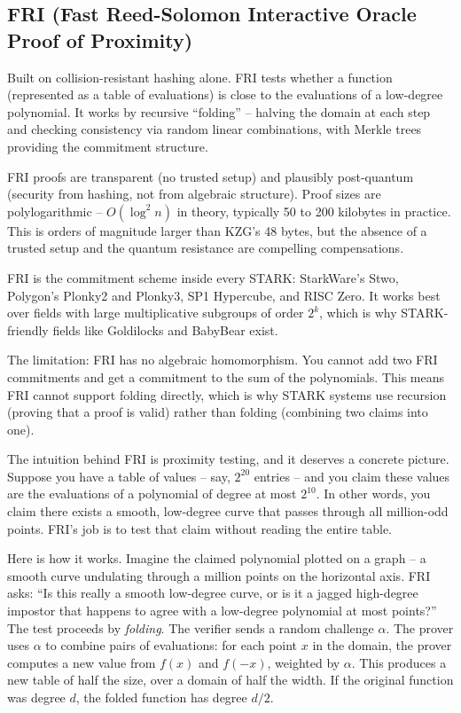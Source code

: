 \documentclass[
  11pt,
  openany]{report}
\begin{document}
\subsection{FRI (Fast Reed-Solomon Interactive Oracle Proof of
Proximity)}\label{fri-fast-reed-solomon-interactive-oracle-proof-of-proximity}

Built on collision-resistant hashing alone. FRI tests whether a function
(represented as a table of evaluations) is close to the evaluations of a
low-degree polynomial. It works by recursive ``folding'' -- halving the domain
at each step and checking consistency via random linear combinations, with
Merkle trees providing the commitment structure.

FRI proofs are transparent (no trusted setup) and plausibly post-quantum
(security from hashing, not from algebraic structure). Proof sizes are
polylogarithmic -- \(O(\log^2 n)\) in theory, typically 50 to 200 kilobytes in
practice. This is orders of magnitude larger than KZG's 48 bytes, but the
absence of a trusted setup and the quantum resistance are compelling
compensations.

FRI is the commitment scheme inside every STARK: StarkWare's Stwo, Polygon's
Plonky2 and Plonky3, SP1 Hypercube, and RISC Zero. It works best over fields
with large multiplicative subgroups of order \(2^k\), which is why
STARK-friendly fields like Goldilocks and BabyBear exist.

The limitation: FRI has no algebraic homomorphism. You cannot add two FRI
commitments and get a commitment to the sum of the polynomials. This means FRI
cannot support folding directly, which is why STARK systems use recursion
(proving that a proof is valid) rather than folding (combining two claims into
one).

The intuition behind FRI is proximity testing, and it deserves a concrete
picture. Suppose you have a table of values -- say, \(2^{20}\) entries -- and
you claim these values are the evaluations of a polynomial of degree at most
\(2^{10}\). In other words, you claim there exists a smooth, low-degree curve
that passes through all million-odd points. FRI's job is to test that claim
without reading the entire table.

Here is how it works. Imagine the claimed polynomial plotted on a graph -- a
smooth curve undulating through a million points on the horizontal axis. FRI
asks: ``Is this really a smooth low-degree curve, or is it a jagged high-degree
impostor that happens to agree with a low-degree polynomial at most points?''
The test proceeds by \emph{folding}. The verifier sends a random challenge
\(\alpha\). The prover uses \(\alpha\) to combine pairs of evaluations: for each
point \(x\) in the domain, the prover computes a new value from \(f(x)\) and
\(f(-x)\), weighted by \(\alpha\). This produces a new table of half the size,
over a domain of half the width. If the original function was degree \(d\), the
folded function has degree \(d/2\).
\end{document}
